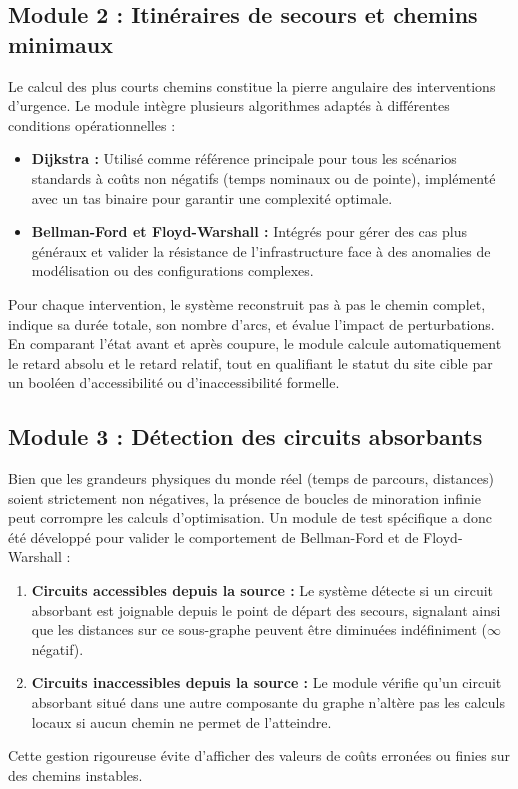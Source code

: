 \subsection{Module 2 : Itinéraires de secours et chemins minimaux}
Le calcul des plus courts chemins constitue la pierre angulaire des interventions d'urgence. Le module intègre plusieurs algorithmes adaptés à différentes conditions opérationnelles :
\begin{itemize}
    \item \textbf{Dijkstra :} Utilisé comme référence principale pour tous les scénarios standards à coûts non négatifs (temps nominaux ou de pointe), implémenté avec un tas binaire pour garantir une complexité optimale.
    \item \textbf{Bellman-Ford et Floyd-Warshall :} Intégrés pour gérer des cas plus généraux et valider la résistance de l'infrastructure face à des anomalies de modélisation ou des configurations complexes.
\end{itemize}
Pour chaque intervention, le système reconstruit pas à pas le chemin complet, indique sa durée totale, son nombre d'arcs, et évalue l'impact de perturbations. En comparant l'état avant et après coupure, le module calcule automatiquement le retard absolu et le retard relatif, tout en qualifiant le statut du site cible par un booléen d'accessibilité ou d'inaccessibilité formelle.

\subsection{Module 3 : Détection des circuits absorbants}
Bien que les grandeurs physiques du monde réel (temps de parcours, distances) soient strictement non négatives, la présence de boucles de minoration infinie peut corrompre les calculs d'optimisation. Un module de test spécifique a donc été développé pour valider le comportement de Bellman-Ford et de Floyd-Warshall :
\begin{enumerate}
    \item \textbf{Circuits accessibles depuis la source :} Le système détecte si un circuit absorbant est joignable depuis le point de départ des secours, signalant ainsi que les distances sur ce sous-graphe peuvent être diminuées indéfiniment ($\infty$ négatif).
    \item \textbf{Circuits inaccessibles depuis la source :} Le module vérifie qu'un circuit absorbant situé dans une autre composante du graphe n'altère pas les calculs locaux si aucun chemin ne permet de l'atteindre.
\end{enumerate}
Cette gestion rigoureuse évite d'afficher des valeurs de coûts erronées ou finies sur des chemins instables.

